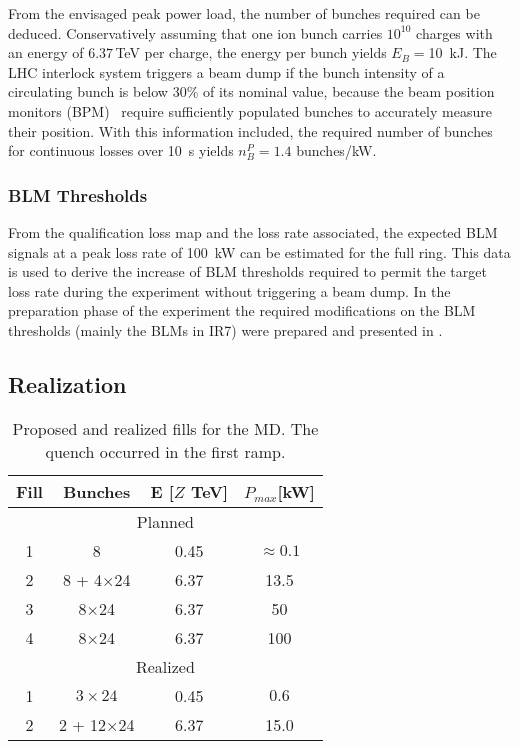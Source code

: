From the envisaged peak power load, the number of bunches required can be deduced. Conservatively assuming that one ion bunch carries $10^{10}$ charges with an energy of $6.37\,$TeV per charge, the energy per bunch yields $E_B=$10~kJ. The LHC interlock system triggers a beam dump if the bunch intensity of a circulating bunch is below 30\% of its nominal value, because the beam position monitors (BPM)~\cite{} require sufficiently populated bunches to accurately measure their position. With this information included, the required number of bunches for continuous losses over 10~s yields $ n_B^P=1.4$ bunches/kW.

\subsubsection{BLM Thresholds}

From the qualification loss map and the loss rate associated, the expected BLM signals at a peak loss rate of 100~kW can be estimated for the full ring. This data is used to derive the increase of BLM thresholds required to permit the target loss rate during the experiment without triggering a beam dump. In the preparation phase of the experiment the required modifications on the BLM thresholds (mainly the BLMs in IR7) were prepared and presented in \cite{BLM-ECR-0043}. 

\subsection{Realization}

	\begin{table}[tb]
		\centering
		\caption{Proposed and realized fills for the MD. The quench occurred in the first ramp.}
		\label{tab:filling_scheme}
		\begin{tabular}{cccc}
                  \toprule
		Fill & Bunches & E {[}$Z$ TeV{]} & $P_{max}${[}kW{]} \\ \midrule
		\multicolumn{4}{c}{Planned} \\ \midrule
		1    & 8     & 0.45          & $\approx 0.1$        \\
		2    & 8 + 4$\times$24  & 6.37          & 13.5       \\
		3    & 8$\times$24  & 6.37          & 50     \\
		4    & 8$\times$24  & 6.37          & 100        \\ \midrule
		\multicolumn{4}{c}{Realized} \\ \hline
		1    & $3 \times 24$     & 0.45          & $0.6$        \\
		2    & 2 + 12$\times$24  & 6.37          & 15.0       \\
		\bottomrule
		\end{tabular}
	\end{table}

